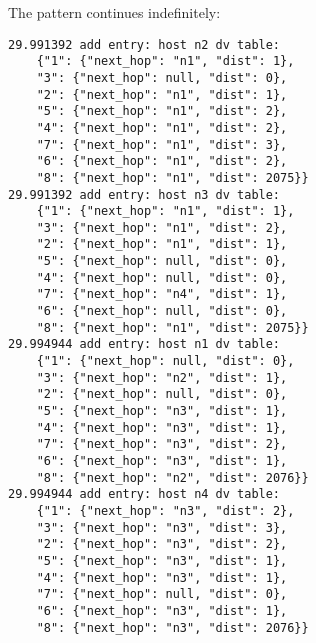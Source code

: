 \documentclass[11pt]{article}
\begin{document}
The pattern continues indefinitely:
\begin{lstlisting}
29.991392 add entry: host n2 dv table:
	{"1": {"next_hop": "n1", "dist": 1},
	"3": {"next_hop": null, "dist": 0},
	"2": {"next_hop": "n1", "dist": 1},
	"5": {"next_hop": "n1", "dist": 2},
	"4": {"next_hop": "n1", "dist": 2},
	"7": {"next_hop": "n1", "dist": 3},
	"6": {"next_hop": "n1", "dist": 2},
	"8": {"next_hop": "n1", "dist": 2075}}
29.991392 add entry: host n3 dv table:
	{"1": {"next_hop": "n1", "dist": 1},
	"3": {"next_hop": "n1", "dist": 2},
	"2": {"next_hop": "n1", "dist": 1},
	"5": {"next_hop": null, "dist": 0},
	"4": {"next_hop": null, "dist": 0},
	"7": {"next_hop": "n4", "dist": 1},
	"6": {"next_hop": null, "dist": 0},
	"8": {"next_hop": "n1", "dist": 2075}}
29.994944 add entry: host n1 dv table:
	{"1": {"next_hop": null, "dist": 0},
	"3": {"next_hop": "n2", "dist": 1},
	"2": {"next_hop": null, "dist": 0},
	"5": {"next_hop": "n3", "dist": 1},
	"4": {"next_hop": "n3", "dist": 1},
	"7": {"next_hop": "n3", "dist": 2},
	"6": {"next_hop": "n3", "dist": 1},
	"8": {"next_hop": "n2", "dist": 2076}}
29.994944 add entry: host n4 dv table:
	{"1": {"next_hop": "n3", "dist": 2},
	"3": {"next_hop": "n3", "dist": 3},
	"2": {"next_hop": "n3", "dist": 2},
	"5": {"next_hop": "n3", "dist": 1},
	"4": {"next_hop": "n3", "dist": 1},
	"7": {"next_hop": null, "dist": 0},
	"6": {"next_hop": "n3", "dist": 1},
	"8": {"next_hop": "n3", "dist": 2076}}
\end{lstlisting}
\end{document}
